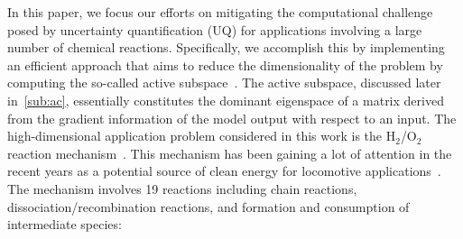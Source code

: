 In this paper, we focus our efforts on mitigating the computational challenge posed by uncertainty
quantification (UQ) for applications involving a large number of chemical reactions. Specifically, we
accomplish this by implementing an efficient approach that aims to reduce the dimensionality
of the problem by computing the so-called active subspace~\cite{Constantine:2015}. 
The active subspace, discussed later in~\ref{sub:ac}, essentially constitutes the dominant
eigenspace of a matrix derived from the gradient information of the model output with respect
to an input. The high-dimensional application problem considered in this work is the H$_2$/O$_2$
reaction mechanism~\cite{Yetter:1991}. This mechanism has been gaining a lot of attention in the
recent years as a potential source of clean energy for locomotive applications~\cite{Das:1996}.   
The mechanism involves 19 reactions including chain reactions, dissociation/recombination reactions, and
formation and consumption of intermediate species:

